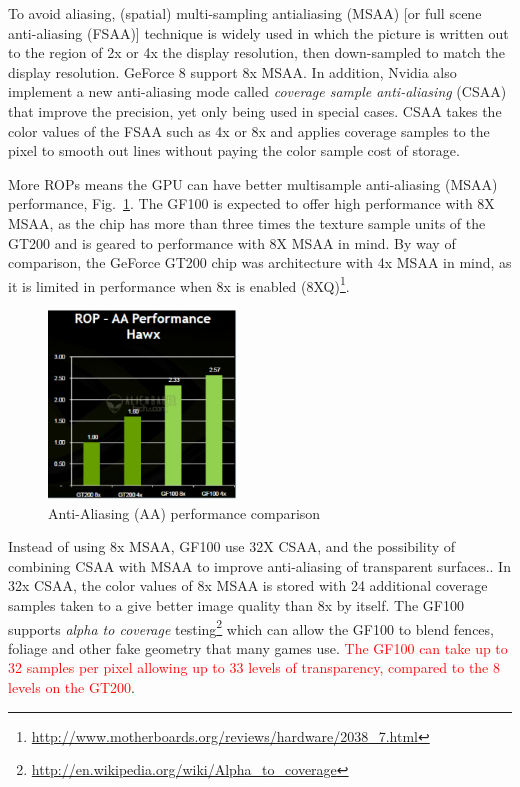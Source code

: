 To avoid aliasing, (spatial) multi-sampling antialiasing (MSAA) [or
full scene anti-aliasing (FSAA)] technique is widely used in which the
picture is written out to the region of 2x or 4x the display
resolution, then down-sampled to match the display resolution. GeForce
8 support 8x MSAA. In addition, Nvidia also implement a new
anti-aliasing mode called {\it coverage sample anti-aliasing} (CSAA)
that improve the precision, yet only being used in special cases.
CSAA takes the color values of the FSAA such as 4x or 8x and applies
coverage samples to the pixel to smooth out lines without paying the
color sample cost of storage.

\begin{framed}
  More ROPs means the GPU can have better multisample anti-aliasing
  (MSAA) performance, Fig.~\ref{fig:anti_alias}.  The GF100 is expected
  to offer high performance with 8X MSAA, as the chip has more than
  three times the texture sample units of the GT200 and is geared to
  performance with 8X MSAA in mind. By way of comparison, the GeForce
  GT200 chip was architecture with 4x MSAA in mind, as it is limited in
  performance when 8x is enabled
  (8XQ)\footnote{\url{http://www.motherboards.org/reviews/hardware/2038_7.html}}.
\end{framed}

\begin{figure}[hbt]
  \centerline{\includegraphics[height=5cm,
    angle=0]{./images/fermi_anti-alias.eps}}
  \caption{Anti-Aliasing (AA) performance comparison}
  \label{fig:anti_alias}
\end{figure}

Instead of using 8x MSAA, GF100 use 32X CSAA, and the possibility of
combining CSAA with MSAA to improve anti-aliasing of transparent
surfaces.. In 32x CSAA, the color values of 8x MSAA is stored with 24
additional coverage samples taken to a give better image quality than
8x by itself. The GF100 supports {\it alpha to coverage}
testing\footnote{\url{http://en.wikipedia.org/wiki/Alpha_to_coverage}}
which can allow the GF100 to blend fences, foliage and other fake
geometry that many games use.
\textcolor{red}{The GF100 can take up to 32 samples per pixel allowing
  up to 33 levels of transparency, compared to the 8 levels on the
  GT200}.


